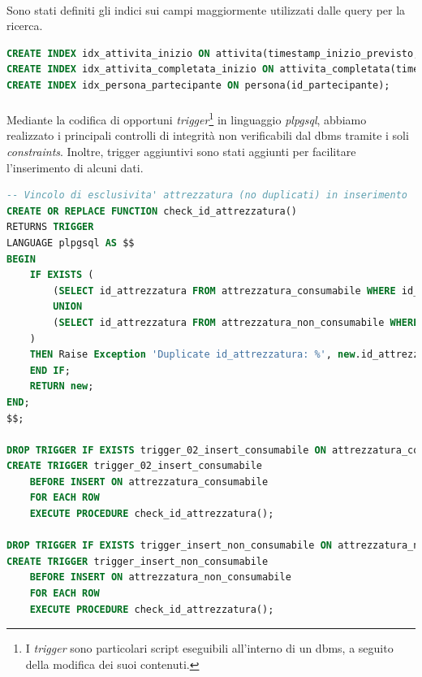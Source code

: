 \documentclass[11pt,a4paper,english]{article}
\begin{document}
\paragraph{} Sono stati definiti gli indici sui campi maggiormente utilizzati dalle query per la ricerca. 

\begin{lstlisting}[language=SQL, caption=Esempio di implementazione di indici]
CREATE INDEX idx_attivita_inizio ON attivita(timestamp_inizio_previsto, timestamp_fine_previsto);
CREATE INDEX idx_attivita_completata_inizio ON attivita_completata(timestamp_inizio_effettivo, timestamp_fine_effettivo); -- Per quantita' stimata di attrezzaura consumabile
CREATE INDEX idx_persona_partecipante ON persona(id_partecipante);
\end{lstlisting}

\paragraph{} Mediante la codifica di opportuni \emph{trigger}\footnote{I \emph{trigger} sono particolari script eseguibili all'interno di un dbms, a seguito della modifica dei suoi contenuti.} in linguaggio \emph{plpgsql}, abbiamo realizzato i principali controlli di integrità non verificabili dal dbms tramite i soli \emph{constraints}. Inoltre, trigger aggiuntivi sono stati aggiunti per facilitare l'inserimento di alcuni dati.

\begin{lstlisting}[language=SQL, caption=Esempio di implementazione di trigger]
-- Vincolo di esclusivita' attrezzatura (no duplicati) in inserimento
CREATE OR REPLACE FUNCTION check_id_attrezzatura()
RETURNS TRIGGER
LANGUAGE plpgsql AS $$
BEGIN
    IF EXISTS (
        (SELECT id_attrezzatura FROM attrezzatura_consumabile WHERE id_attrezzatura = new.id_attrezzatura)
        UNION
        (SELECT id_attrezzatura FROM attrezzatura_non_consumabile WHERE id_attrezzatura = new.id_attrezzatura)
    )
    THEN Raise Exception 'Duplicate id_attrezzatura: %', new.id_attrezzatura;
    END IF;
    RETURN new;
END;
$$;

DROP TRIGGER IF EXISTS trigger_02_insert_consumabile ON attrezzatura_consumabile; -- Il '02' nel nome serve perche' i trigger su una tabella sono controllati in ordine alfabetico
CREATE TRIGGER trigger_02_insert_consumabile
    BEFORE INSERT ON attrezzatura_consumabile
    FOR EACH ROW
    EXECUTE PROCEDURE check_id_attrezzatura();

DROP TRIGGER IF EXISTS trigger_insert_non_consumabile ON attrezzatura_non_consumabile;
CREATE TRIGGER trigger_insert_non_consumabile
    BEFORE INSERT ON attrezzatura_non_consumabile
    FOR EACH ROW
    EXECUTE PROCEDURE check_id_attrezzatura();
\end{lstlisting}
\end{document}
